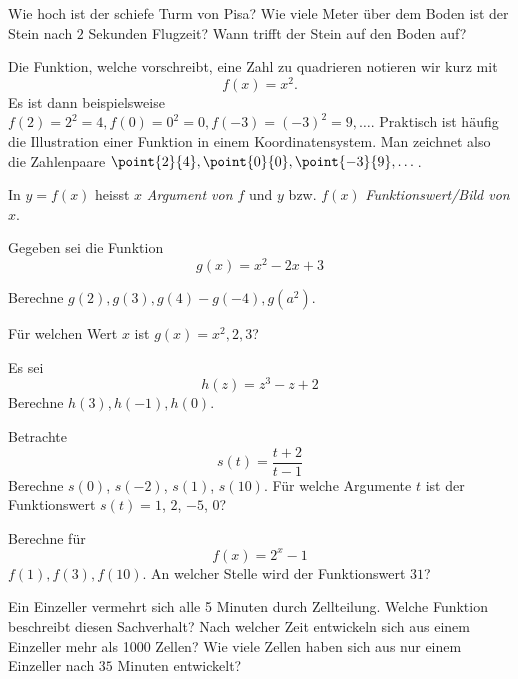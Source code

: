 \documentclass[%
11pt,%
twoside,%
titlepage,%
german,%
headsepline%
]{scrartcl}
\begin{document}
\begin{ueb}
Wie hoch ist der schiefe Turm von Pisa? Wie viele Meter \"uber dem Boden ist der Stein nach $2$ Sekunden Flugzeit? Wann trifft der Stein auf den Boden auf?
\end{ueb}

\begin{bsp}
Die Funktion, welche vorschreibt, eine Zahl zu quadrieren notieren wir kurz mit
$$f(x)=x^2.$$
Es ist dann beispielsweise $f(2)=2^2=4, f(0)=0^2=0, f(-3)=(-3)^2=9,\dots$. Praktisch ist h\"aufig die Illustration einer Funktion in einem Koordinatensystem. Man zeichnet also die Zahlenpaare $\point{2}{4}, \point{0}{0}, \point{-3}{9},\dots$.
\end{bsp}
\begin{bem}
In $y=f(x)$ heisst $x$ \emph{Argument von $f$} und $y$ bzw. $f(x)$ \emph{Funktionswert/Bild von $x$}.
\end{bem}
\begin{ueb}[Schreibweise]
Gegeben sei die Funktion
$$g(x)=x^2-2x+3$$
\begin{enumeratea}
\item Berechne $g(2),g(3),g(4)-g(-4),g(a^2)$.
\item F\"ur welchen Wert $x$ ist $g(x)=x^2,2,3$?
\end{enumeratea}
\end{ueb}
\begin{ueb}[Schreibweise 2]
Es sei
$$h(z)=z^3-z+2$$
Berechne $h(3),h(-1),h(0)$.
\end{ueb}
\begin{ueb}[Schreibweise 3]
Betrachte
$$s(t)=\frac{t+2}{t-1}$$
Berechne $s(0)$, $s(-2)$, $s(1)$, $s(10)$. F\"ur welche Argumente $t$ ist der Funktionswert $s(t)=1$, $2$, $-5$, $0$?
\end{ueb}
\begin{ueb}[Schreibweise 4]
Berechne f\"ur
$$f(x)=2^x-1$$
$f(1),f(3),f(10)$. An welcher Stelle wird der Funktionswert $31$?
\end{ueb}
\begin{ueb}[Zellteilung]
Ein Einzeller vermehrt sich alle 5 Minuten durch Zellteilung. Welche Funktion beschreibt diesen Sachverhalt? Nach welcher Zeit entwickeln sich aus einem Einzeller mehr als 1000 Zellen? Wie viele Zellen haben sich aus nur einem Einzeller nach $35$ Minuten entwickelt?
\end{ueb}
\end{document}
